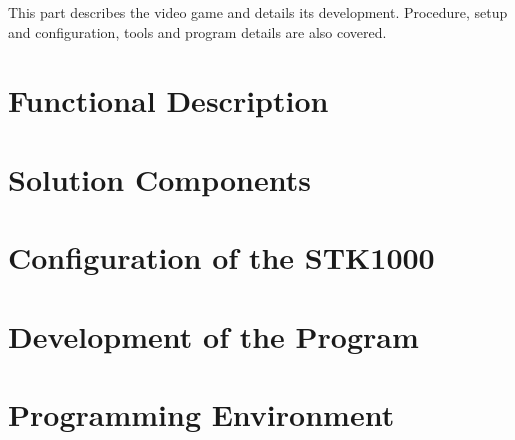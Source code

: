 This part describes the video game and details its development. Procedure, setup and configuration, tools and program details are also covered.
\section{Functional Description}
	

\section{Solution Components}
	

\section{Configuration of the STK1000}
	

\section{Development of the Program}
	

\section{Programming Environment}
	